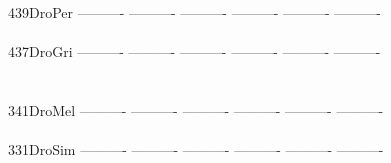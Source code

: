 \documentclass[11pt,twoside,reqno,a4paper]{article}
\begin{document}
{439\hspace*{1\charwidth}DroPer	----------	----------	----------	----------	----------	----------	\\
\hspace*{4\charwidth}\hspace*{7\charwidth}\hspace*{1\charwidth}\hspace*{1\charwidth}\hspace*{1\charwidth}\hspace*{1\charwidth}\hspace*{1\charwidth}\hspace*{1\charwidth}\\
437\hspace*{1\charwidth}DroGri	----------	----------	----------	----------	----------	----------	\\
\hspace*{4\charwidth}\hspace*{7\charwidth}\hspace*{1\charwidth}\hspace*{1\charwidth}\hspace*{1\charwidth}\hspace*{1\charwidth}\hspace*{1\charwidth}\hspace*{1\charwidth}\\
\\
341\hspace*{1\charwidth}DroMel	----------	----------	----------	----------	----------	----------	\\
\hspace*{4\charwidth}\hspace*{7\charwidth}\hspace*{1\charwidth}\hspace*{1\charwidth}\hspace*{1\charwidth}\hspace*{1\charwidth}\hspace*{1\charwidth}\hspace*{1\charwidth}\\
331\hspace*{1\charwidth}DroSim	----------	----------	----------	----------	----------	----------	\\
\hspace*{4\charwidth}\hspace*{7\charwidth}\hspace*{1\charwidth}\hspace*{1\charwidth}\hspace*{1\charwidth}\hspace*{1\charwidth}\hspace*{1\charwidth}\hspace*{1\charwidth}\\
}
\end{document}
